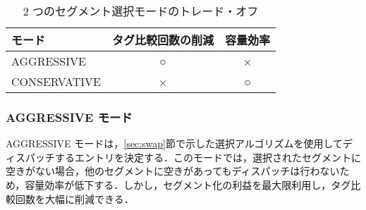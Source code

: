 \begin{table}[tb]
  \caption{2 つのセグメント選択モードのトレード・オフ}
  \footnotesize
  \center
   \begin{tabular}{l|c|c} \hline \hline
   モード & タグ比較回数の削減 & 容量効率 \\ \hline
   AGGRESSIVE & ○ & × \\
   CONSERVATIVE & × & ○ \\ \hline
  \end{tabular}
  \label{tab:switch_trade_off}
\end{table}

\subsubsection{AGGRESSIVE モード}
AGGRESSIVE モードは，\ref{sec:swap}節で示した選択アルゴリズムを使用してディスパッチするエントリを決定する．このモードでは，選択されたセグメントに空きがない場合，他のセグメントに空きがあってもディスパッチは行わないため，容量効率が低下する．しかし，セグメント化の利益を最大限利用し，タグ比較回数を大幅に削減できる．

